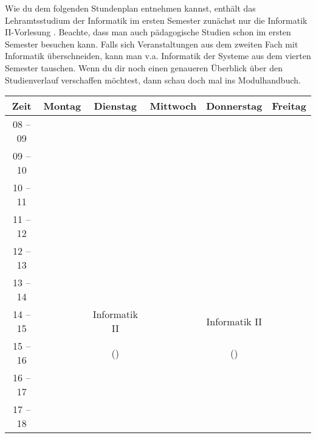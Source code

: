 Wie du dem folgenden Stundenplan entnehmen kannst, enthält das Lehramtsstudium der Informatik im ersten Semester zunächst nur die Informatik II-Vorlesung . %
Beachte, dass man auch pädagogische Studien schon im ersten Semester besuchen kann. Falls sich Veranstaltungen aus dem zweiten
Fach mit Informatik überschneiden, kann man v.a. Informatik der Systeme aus dem vierten Semester tauschen.
Wenn du dir noch einen genaueren Überblick über den Studienverlauf verschaffen möchtest, dann schau doch mal ins Modulhandbuch.

\noindent{}

\begin{center}
	\begin{tabular}{|c|c|c|c|c|c|} \hline
		Zeit      & 	Montag 		& Dienstag			& Mittwoch 			& Donnerstag 		& Freitag	 \\\hline\hline
		08 -- 09  &					& 					&					& 					&			\\\hline
		09 -- 10  & 				& 					& 					& 					&			\\\hline
		10 -- 11  &					& 					&					& 					&			\\\hline
		11 -- 12  & 				&  					&					&			 		& 			\\\hline
		12 -- 13  & 				& 				 	& 				    & 					& 			 \\\hline
		13 -- 14  & 				& 					& 					& 					& 			 \\\hline
		14 -- 15  & 				& Informatik II 	& 					& Informatik II 	& 				\\\cline{1-2}\cline{4-4}\cline{6-6}
		15 -- 16  &					& (\Infoprof) 		& 					& (\Infoprof) 		& 				\\\hline
		16 -- 17  & 				& 					& 					& 					&\\\hline
		17 -- 18  & 				& 					& 					& 					& \\
		\hline
	\end{tabular}


\end{center}

